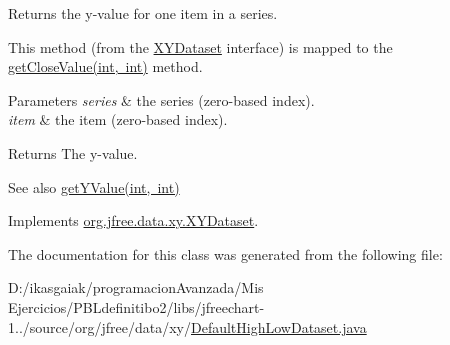 Returns the y-\/value for one item in a series. 

This method (from the \mbox{\hyperlink{interfaceorg_1_1jfree_1_1data_1_1xy_1_1_x_y_dataset}{X\+Y\+Dataset}} interface) is mapped to the \mbox{\hyperlink{classorg_1_1jfree_1_1data_1_1xy_1_1_default_high_low_dataset_af316dffa7faed1c0c8c2f66b7b0acf5f}{get\+Close\+Value(int, int)}} method.


\begin{DoxyParams}{Parameters}
{\em series} & the series (zero-\/based index). \\
\hline
{\em item} & the item (zero-\/based index).\\
\hline
\end{DoxyParams}
\begin{DoxyReturn}{Returns}
The y-\/value.
\end{DoxyReturn}
\begin{DoxySeeAlso}{See also}
\mbox{\hyperlink{classorg_1_1jfree_1_1data_1_1xy_1_1_abstract_x_y_dataset_a2a37653acb0e32c2dbf89fd9ca8695fe}{get\+Y\+Value(int, int)}} 
\end{DoxySeeAlso}


Implements \mbox{\hyperlink{interfaceorg_1_1jfree_1_1data_1_1xy_1_1_x_y_dataset_aa915867221e0f94021bad3140db5254e}{org.\+jfree.\+data.\+xy.\+X\+Y\+Dataset}}.



The documentation for this class was generated from the following file\+:\begin{DoxyCompactItemize}
\item 
D\+:/ikasgaiak/programacion\+Avanzada/\+Mis Ejercicios/\+P\+B\+Ldefinitibo2/libs/jfreechart-\/1../source/org/jfree/data/xy/\mbox{\hyperlink{_default_high_low_dataset_8java}{Default\+High\+Low\+Dataset.\+java}}\end{DoxyCompactItemize}
